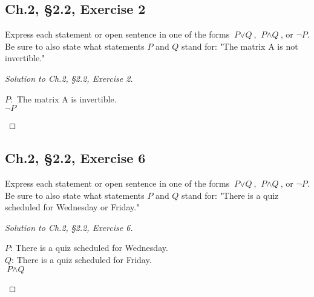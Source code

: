 \documentclass[12pt]{amsart}
\numberwithin{equation}{section}
\theoremstyle{definition}
\theoremstyle{remark}
\begin{document}


\subsection*{Ch.2, \S 2.2,  Exercise 2}  Express each statement or open sentence in one of the forms $ \textit{P} \lor \textit{Q} $, $ \textit{P} \land \textit{Q} $, or $ \lnot \textit{P} $. Be sure to also state what statements $ \textit{P} $ and $ \textit{Q} $ stand for: "The matrix A is not invertible."



\begin{proof}[Solution to Ch.2, \S 2.2,  Exercise 2]
\ \\

\begin{center}
$ \textit{P} : $ The matrix A is invertible. \\
$ \lnot \textit{P} $
\end{center}

\end{proof}





\subsection*{Ch.2, \S 2.2,  Exercise 6}   Express each statement or open sentence in one of the forms $ \textit{P} \lor \textit{Q} $, $ \textit{P} \land \textit{Q} $, or $ \lnot \textit{P} $. Be sure to also state what statements $ \textit{P} $ and $ \textit{Q} $ stand for: "There is a quiz scheduled for Wednesday or Friday."



\begin{proof}[Solution to Ch.2, \S 2.2,  Exercise 6]
\ \\

\begin{center}
$ \textit{P} $: There is a quiz scheduled for Wednesday. \\
$ \textit{Q} $: There is a quiz scheduled for Friday. \\
$ \textit{P} \land \textit{Q} $
\end{center}

\end{proof}
\end{document}
